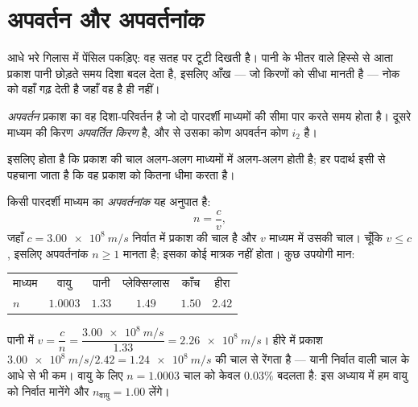 \section{अपवर्तन और अपवर्तनांक}

आधे भरे गिलास में पेंसिल पकड़िए: वह सतह पर टूटी दिखती है। पानी के भीतर
वाले हिस्से से आता प्रकाश पानी छोड़ते समय दिशा बदल देता है, इसलिए आँख
--- जो किरणों को सीधा मानती है --- नोक को वहाँ गढ़ देती है जहाँ वह है
ही नहीं।

\begin{definition}[अपवर्तन]\label{def:g10:refraction:refraction}
\emph{अपवर्तन} प्रकाश का वह दिशा-परिवर्तन है जो दो
पारदर्शी माध्यमों की सीमा पार करते समय होता है। दूसरे माध्यम की किरण
\emph{अपवर्तित किरण} है, और  से उसका
कोण अपवर्तन कोण $i_2$ है।
\end{definition}

 इसलिए होता है कि प्रकाश की चाल अलग-अलग माध्यमों में
अलग-अलग होती है; हर पदार्थ इसी से पहचाना जाता है कि वह प्रकाश को कितना
धीमा करता है।

\begin{definition}[अपवर्तनांक]\label{def:g10:refraction:index}
किसी पारदर्शी माध्यम का \emph{अपवर्तनांक} यह अनुपात
है:
\[
n = \frac{c}{v},
\]
जहाँ $c = \qty{3.00e8}{m/s}$ निर्वात में प्रकाश की चाल है और $v$ माध्यम में उसकी
चाल। चूँकि $v \leq c$, इसलिए अपवर्तनांक $n \geq 1$ मानता है; इसका कोई
मात्रक नहीं होता। कुछ उपयोगी मान:
\begin{center}
\begin{tabular}{lccccc}
माध्यम & वायु & पानी & प्लेक्सिग्लास & काँच & हीरा \\
$n$ & $1.0003$ & $1.33$ & $1.49$ & $1.50$ & $2.42$ \\
\end{tabular}
\end{center}
\end{definition}

\begin{example}[पानी में प्रकाश की चाल]\label{ex:g10:refraction:speed}
पानी में $v = \dfrac{c}{n} = \dfrac{\qty{3.00e8}{m/s}}{1.33}
= \qty{2.26e8}{m/s}$। हीरे में प्रकाश $\qty{3.00e8}{m/s}/2.42 = \qty{1.24e8}{m/s}$ की चाल से रेंगता है --- यानी
निर्वात वाली चाल के आधे से भी कम। वायु के लिए $n = 1.0003$ चाल को केवल $0.03\%$
बदलता है: इस अध्याय में हम वायु को निर्वात मानेंगे और $n_{\text{वायु}} = 1.00$ लेंगे।
\end{example}

